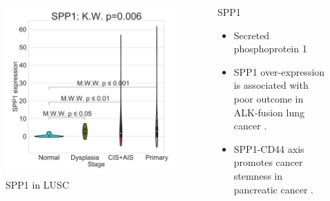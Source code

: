 \documentclass{beamer}
\begin{document}
\begin{frame}[allowframebreaks]
                    \begin{columns}
                        \begin{column}{0.4 \textwidth}
                            \begin{figure}
                                \includegraphics[width=\linewidth]{figures/DEG/Violin/STAR.TPM.SQC.senescence/SPP1.pdf}
                                \caption{SPP1 in LUSC}
                            \end{figure}
                        \end{column}
                        \begin{column}{0.55 \textwidth}
                            \begin{block}{SPP1}
                                \begin{itemize}
                                    \item Secreted phosphoprotein 1
                                    \item SPP1 over-expression is associated with poor outcome in ALK-fusion lung cancer \cite{SPP1-01}.
                                    \item SPP1-CD44 axis promotes cancer stemness in pancreatic cancer \cite{SPP1-02}.
                                \end{itemize}
                            \end{block}
                        \end{column}
                    \end{columns}
                \end{frame}
\end{document}
